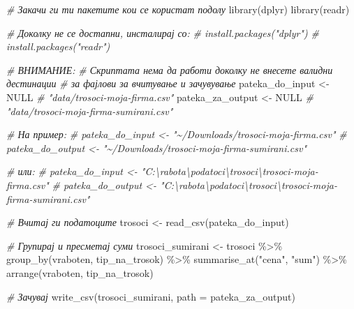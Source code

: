 \documentclass[
]{book}
\newenvironment{Shaded}{\begin{snugshade}}{\end{snugshade}}
\newcommand{\AttributeTok}[1]{\textcolor[rgb]{0.77,0.63,0.00}{#1}}
\newcommand{\CommentTok}[1]{\textcolor[rgb]{0.56,0.35,0.01}{\textit{#1}}}
\newcommand{\ConstantTok}[1]{\textcolor[rgb]{0.00,0.00,0.00}{#1}}
\newcommand{\FunctionTok}[1]{\textcolor[rgb]{0.00,0.00,0.00}{#1}}
\newcommand{\NormalTok}[1]{#1}
\newcommand{\OtherTok}[1]{\textcolor[rgb]{0.56,0.35,0.01}{#1}}
\newcommand{\SpecialCharTok}[1]{\textcolor[rgb]{0.00,0.00,0.00}{#1}}
\newcommand{\StringTok}[1]{\textcolor[rgb]{0.31,0.60,0.02}{#1}}
\begin{document}
\begin{Shaded}
\begin{Highlighting}[]
\CommentTok{\# Закачи ги ти пакетите кои се користат подолу }
\FunctionTok{library}\NormalTok{(dplyr)}
\FunctionTok{library}\NormalTok{(readr)}

\CommentTok{\# Доколку не се достапни, инсталирај со:}
\CommentTok{\# install.packages("dplyr")}
\CommentTok{\# install.packages("readr")}

\CommentTok{\# ВНИМАНИЕ:}
\CommentTok{\# Скриптата нема да работи доколку не внесете валидни дестинации}
\CommentTok{\# за фајлови за вчитување и зачувување}
\NormalTok{pateka\_do\_input }\OtherTok{\textless{}{-}} \ConstantTok{NULL} \CommentTok{\# "data/trosoci{-}moja{-}firma.csv"}
\NormalTok{pateka\_za\_output }\OtherTok{\textless{}{-}} \ConstantTok{NULL} \CommentTok{\# "data/trosoci{-}moja{-}firma{-}sumirani.csv"}

\CommentTok{\# На пример:}
\CommentTok{\# pateka\_do\_input \textless{}{-} "\textasciitilde{}/Downloads/trosoci{-}moja{-}firma.csv" }
\CommentTok{\# pateka\_do\_output \textless{}{-} "\textasciitilde{}/Downloads/trosoci{-}moja{-}firma{-}sumirani.csv" }

\CommentTok{\# или:}
\CommentTok{\# pateka\_do\_input \textless{}{-} "C:\textbackslash{}rabota\textbackslash{}podatoci\textbackslash{}trosoci\textbackslash{}trosoci{-}moja{-}firma.csv"}
\CommentTok{\# pateka\_do\_output \textless{}{-} "C:\textbackslash{}rabota\textbackslash{}podatoci\textbackslash{}trosoci\textbackslash{}trosoci{-}moja{-}firma{-}sumirani.csv"}

\CommentTok{\# Вчитај ги податоците}
\NormalTok{trosoci }\OtherTok{\textless{}{-}} \FunctionTok{read\_csv}\NormalTok{(pateka\_do\_input)}

\CommentTok{\# Групирај и пресметај суми}
\NormalTok{trosoci\_sumirani }\OtherTok{\textless{}{-}}\NormalTok{ trosoci }\SpecialCharTok{\%\textgreater{}\%} 
  \FunctionTok{group\_by}\NormalTok{(vraboten, tip\_na\_trosok) }\SpecialCharTok{\%\textgreater{}\%} 
  \FunctionTok{summarise\_at}\NormalTok{(}\StringTok{"cena"}\NormalTok{, }\StringTok{"sum"}\NormalTok{) }\SpecialCharTok{\%\textgreater{}\%} 
  \FunctionTok{arrange}\NormalTok{(vraboten, tip\_na\_trosok)}

\CommentTok{\# Зачувај}
\FunctionTok{write\_csv}\NormalTok{(trosoci\_sumirani, }
          \AttributeTok{path =}\NormalTok{ pateka\_za\_output)}
\end{Highlighting}
\end{Shaded}
\end{document}
